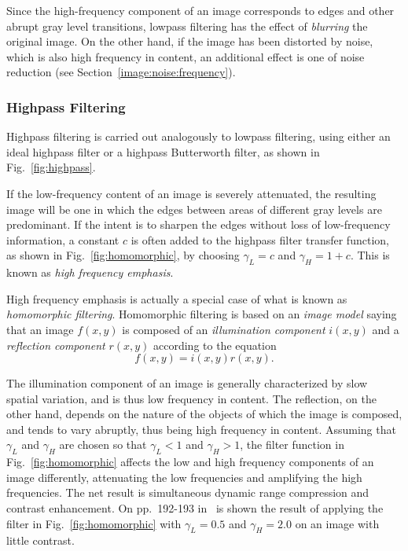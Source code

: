 
Since the high-frequency component of an image corresponds to edges
and other abrupt gray level transitions, lowpass filtering has the
effect of {\em blurring\/} the original image.  On the other hand, if
the image has been distorted by noise, which is also high frequency in
content, an additional effect is one of noise reduction (see
Section~\ref{image:noise:frequency}).

\subsubsection{Highpass Filtering}

Highpass filtering is carried out analogously to lowpass filtering,
using either an ideal highpass filter or a highpass Butterworth
filter, as shown in Fig.~\ref{fig:highpass}.


If the low-frequency content of an image is severely attenuated, the
resulting image will be one in which the edges between areas of
different gray levels are predominant.  If the intent is to sharpen
the edges without loss of low-frequency information, a constant $c$ is
often added to the highpass filter transfer function, as shown in
Fig.~\ref{fig:homomorphic}, by choosing $\gamma_{L}=c$ and
$\gamma_{H}=1+c$.  This is known as {\em high frequency emphasis\/}.


High frequency emphasis is actually a special case of what is known as
{\em homomorphic filtering\/}.  Homomorphic filtering is based on an
{\em image model\/} saying that an image $f(x,y)$ is composed of an
{\em illumination component\/} $i(x,y)$ and a {\em reflection
  component\/} $r(x,y)$ according to the equation
\begin{equation}
  f(x,y)=i(x,y)r(x,y)\mbox{.}
\end{equation}

The illumination component of an image is generally characterized by
slow spatial variation, and is thus low frequency in content.  The
reflection, on the other hand, depends on the nature of the objects of
which the image is composed, and tends to vary abruptly, thus being
high frequency in content.  Assuming that $\gamma_{L}$ and
$\gamma_{H}$ are chosen so that $\gamma_{L}<1$ and $\gamma_{H}>1$, the
filter function in Fig.~\ref{fig:homomorphic} affects the low and high
frequency components of an image differently, attenuating the low
frequencies and amplifying the high frequencies.  The net result is
simultaneous dynamic range compression and contrast enhancement.  On
pp.\ 192-193 in~\cite{digpic} is shown the result of applying the
filter in Fig.~\ref{fig:homomorphic} with $\gamma_{L}=0.5$ and
$\gamma_{H}=2.0$ on an image with little contrast.
